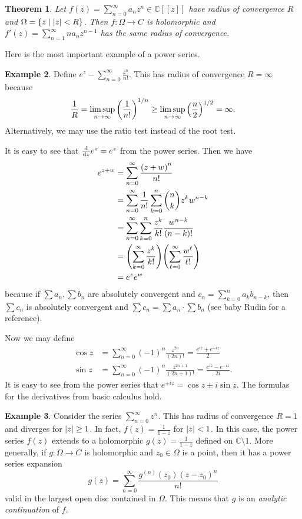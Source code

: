 \documentclass[leqno, openany]{memoir}
\newtheorem{thm}{Theorem}[section]
\theoremstyle{definition}
\newtheorem{exm}[thm]{Example}
\theoremstyle{remark}
\theoremstyle{plain}
\theoremstyle{definition}
\theoremstyle{remark}
\newcommand{\C}{\mathbb{C}}
\begin{document}
\begin{thm}
    Let $f(z) = \sum_{n=0}^{\infty} a_n z^n \in \C[[z]]$ have radius of convergence $R$ and $\Omega = \qty{z \mid \abs{z} < R}$. Then $f \colon \Omega \to C$ is holomorphic and $f'(z) = \sum_{n=1}^{\infty} n a_n z^{n-1}$ has the same radius of convergence.
\end{thm}

Here is the most important example of a power series.
\begin{exm}
    Define $e^z - \sum_{n = 0}^{\infty} \frac{z^n}{n!}$. This has radius of convergence $R = \infty$ because 
    \[ \frac{1}{R} = \limsup_{n \to \infty} {\qty(\frac{1}{n!})}^{1/n} \geq \limsup_{n \to \infty} {\qty(\frac{n}{2})}^{1/2} = \infty. \]
    Alternatively, we may use the ratio test instead of the root test.
\end{exm}

It is easy to see that $\dv{z} e^z = e^z$ from the power series. Then we have
\begin{align*}
    e^{z+w} &= \sum_{n=0}^{\infty} \frac{{(z+w)}^n}{n!} \\
            &= \sum_{n=0}^{\infty} \frac{1}{n!} \sum_{k=0}^n \binom{n}{k} z^k w^{n-k} \\
            &= \sum_{n=0}^{\infty} \sum_{k=0}^{n} \frac{z^k}{k!} \frac{w^{n-k}}{(n-k)!} \\
            &= \qty(\sum_{k=0}^{\infty} \frac{z^k}{k!}) \qty(\sum_{\ell = 0}^{\infty} \frac{w^{\ell}}{\ell!}) \\
            &= e^z e^w
\end{align*}
because if $\sum a_n, \sum b_n$ are absolutely convergent and $c_n = \sum_{k=0}^n a_k b_{n-k}$, then $\sum c_n$ is absolutely convergent and $\sum c_n = \sum a_n \cdot \sum b_n$ (see baby Rudin for a reference).

Now we may define
\begin{align*}
    \cos z &= \sum_{n=0}^{\infty} {(-1)}^n \frac{z^{2n}}{(2n)!} = \frac{e^{iz} + e^{-iz}}{2} \\
    \sin z &= \sum_{n=0}^{\infty} {(-1)}^n \frac{z^{2n+1}}{(2n+1)!} = \frac{e^{iz} - e^{-iz}}{2i}.
\end{align*}
It is easy to see from the power series that $e^{\pm iz} = \cos z \pm i \sin z$. The formulas for the derivatives from basic calculus hold.

\begin{exm}
    Consider the series $\sum_{n=0}^{\infty} z^n$. This has radius of convergence $R = 1$ and diverges for $\abs{z} \geq 1$. In fact, $f(z) = \frac{1}{1-z}$ for $\abs{z} < 1$. In this case, the power series $f(z)$ extends to a holomorphic $g(z) = \frac{1}{1-z}$ defined on $\C \setminus \qty{1}$. More generally, if $g \colon \Omega \to C$ is holomorphic and $z_0 \in \Omega$ is a point, then it has a power series expansion 
    \[ g(z) = \sum_{n=0}^{\infty} \frac{g^{(n)}(z_0) {(z-z_0)}^n}{n!} \]
    valid in the largest open disc contained in $\Omega$. This means that $g$ is an \textit{analytic continuation} of $f$. 
\end{exm}
\end{document}
